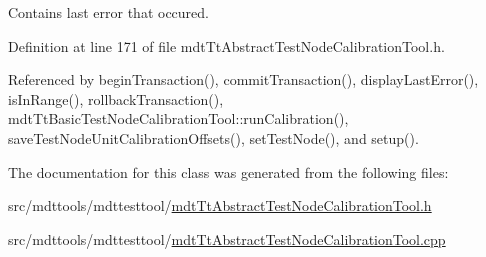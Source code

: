 Contains last error that occured. 



Definition at line 171 of file mdt\-Tt\-Abstract\-Test\-Node\-Calibration\-Tool.\-h.



Referenced by begin\-Transaction(), commit\-Transaction(), display\-Last\-Error(), is\-In\-Range(), rollback\-Transaction(), mdt\-Tt\-Basic\-Test\-Node\-Calibration\-Tool\-::run\-Calibration(), save\-Test\-Node\-Unit\-Calibration\-Offsets(), set\-Test\-Node(), and setup().



The documentation for this class was generated from the following files\-:\begin{DoxyCompactItemize}
\item 
src/mdttools/mdttesttool/\hyperlink{mdt_tt_abstract_test_node_calibration_tool_8h}{mdt\-Tt\-Abstract\-Test\-Node\-Calibration\-Tool.\-h}\item 
src/mdttools/mdttesttool/\hyperlink{mdt_tt_abstract_test_node_calibration_tool_8cpp}{mdt\-Tt\-Abstract\-Test\-Node\-Calibration\-Tool.\-cpp}\end{DoxyCompactItemize}
